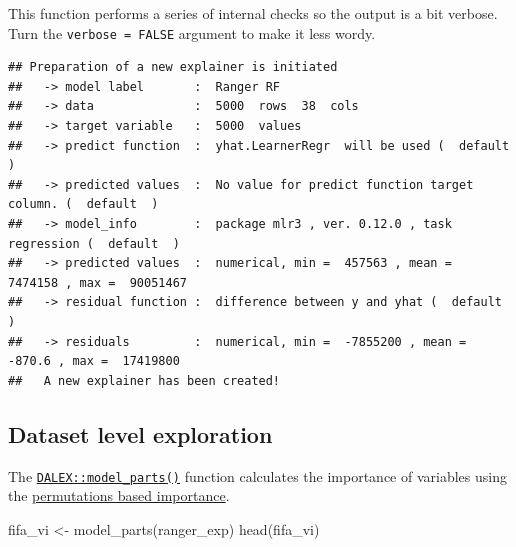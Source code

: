 \documentclass[
]{scrbook}
\newenvironment{Shaded}{\begin{snugshade}}{\end{snugshade}}
\newcommand{\AttributeTok}[1]{\textcolor[rgb]{0.77,0.63,0.00}{#1}}
\newcommand{\ConstantTok}[1]{\textcolor[rgb]{0.00,0.00,0.00}{#1}}
\newcommand{\FunctionTok}[1]{\textcolor[rgb]{0.00,0.00,0.00}{#1}}
\newcommand{\NormalTok}[1]{#1}
\newcommand{\OtherTok}[1]{\textcolor[rgb]{0.56,0.35,0.01}{#1}}
\newcommand{\SpecialCharTok}[1]{\textcolor[rgb]{0.00,0.00,0.00}{#1}}
\newcommand{\StringTok}[1]{\textcolor[rgb]{0.31,0.60,0.02}{#1}}
\renewenvironment{Shaded} {\begin{snugshade}\small} {\end{snugshade}}
\begin{document}
This function performs a series of internal checks so the output is a bit verbose. Turn the \texttt{verbose\ =\ FALSE} argument to make it less wordy.

\begin{Shaded}
\end{Shaded}

\begin{verbatim}
## Preparation of a new explainer is initiated
##   -> model label       :  Ranger RF 
##   -> data              :  5000  rows  38  cols 
##   -> target variable   :  5000  values 
##   -> predict function  :  yhat.LearnerRegr  will be used (  default  )
##   -> predicted values  :  No value for predict function target column. (  default  )
##   -> model_info        :  package mlr3 , ver. 0.12.0 , task regression (  default  ) 
##   -> predicted values  :  numerical, min =  457563 , mean =  7474158 , max =  90051467  
##   -> residual function :  difference between y and yhat (  default  )
##   -> residuals         :  numerical, min =  -7855200 , mean =  -870.6 , max =  17419800  
##   A new explainer has been created!
\end{verbatim}

\hypertarget{interpretability-dataset-level}{%
\subsection{Dataset level exploration}\label{interpretability-dataset-level}}

The \href{https://www.rdocumentation.org/packages/DALEX/topics/model_parts}{\texttt{DALEX::model\_parts()}} function calculates the importance of variables using the \href{https://pbiecek.github.io/ema/featureImportance.html}{permutations based importance}.

\begin{Shaded}
\begin{Highlighting}[]
\NormalTok{fifa\_vi }\OtherTok{\textless{}{-}} \FunctionTok{model\_parts}\NormalTok{(ranger\_exp)}
\FunctionTok{head}\NormalTok{(fifa\_vi)}
\end{Highlighting}
\end{Shaded}
\end{document}
